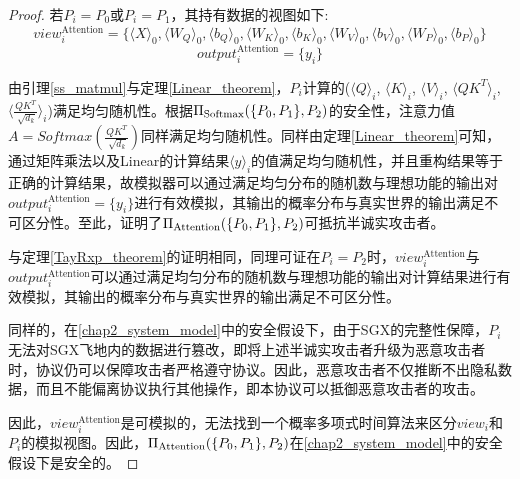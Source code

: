 \begin{proof}
	若$P_i=P_0$或$P_i=P_1$，其持有数据的视图如下:
	$$view_i^{\text{Attention}}=\{\langle X\rangle_0, \langle W_Q\rangle_0, \langle b_Q\rangle_0, \langle W_K\rangle_0, \langle b_K\rangle_0, \langle W_V\rangle_0, \langle b_V\rangle_0, \langle W_P\rangle_0, \langle b_P\rangle_0\}$$
	$$output_i^{\text{Attention}}=\{y_i\}$$
	
	由引理\ref{ss_matmul}与定理\ref{Linear_theorem}，$P_i$计算的($\langle Q\rangle_i$, $\langle K\rangle_i$, $\langle V\rangle_i$, $\langle QK^T\rangle_i$, $\langle\frac{ QK^T }{\sqrt[]{d_k}}\rangle_i$)满足均匀随机性。根据$\Pi_{\rm Softmax}(\{P_0, P_1\}, P_2)$的安全性，注意力值$A=Softmax(\frac{ QK^T }{\sqrt[]{d_k}})$同样满足均匀随机性。同样由定理\ref{Linear_theorem}可知，通过矩阵乘法以及Linear的计算结果$\langle y\rangle_i$的值满足均匀随机性，并且重构结果等于正确的计算结果，故模拟器可以通过满足均匀分布的随机数与理想功能的输出对$output_i^{\text{Attention}}=\{y_i\}$进行有效模拟，其输出的概率分布与真实世界的输出满足不可区分性。至此，证明了$\Pi_{\rm Attention}(\{P_0, P_1\}, P_2)$可抵抗半诚实攻击者。
	
	与定理\ref{TayRxp_theorem}的证明相同，同理可证在$P_i=P_2$时，$view_i^{\text{Attention}}$与$output_i^{\text{Attention}}$可以通过满足均匀分布的随机数与理想功能的输出对计算结果进行有效模拟，其输出的概率分布与真实世界的输出满足不可区分性。
	
	同样的，在\ref{chap2_system_model}中的安全假设下，由于SGX的完整性保障\cite{SGX_Explained}，$P_i$无法对SGX飞地内的数据进行篡改，即将上述半诚实攻击者升级为恶意攻击者时，协议仍可以保障攻击者严格遵守协议。因此，恶意攻击者不仅推断不出隐私数据，而且不能偏离协议执行其他操作，即本协议可以抵御恶意攻击者的攻击。
	
	因此，$view_i^{\text{Attention}}$是可模拟的，无法找到一个概率多项式时间算法来区分$view_i$和$P_i$的模拟视图。因此，$\Pi_{\rm Attention}(\{P_0, P_1\}, P_2)$在\ref{chap2_system_model}中的安全假设下是安全的。
	
\end{proof}





